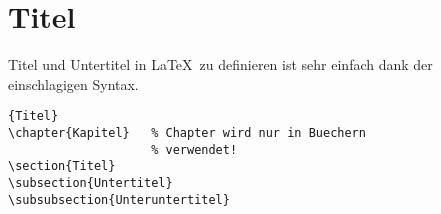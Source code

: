 \section{Titel}
\noindent
Titel und Untertitel in \LaTeX~zu definieren ist sehr
einfach dank der einschlagigen Syntax.

\begin{center}
\begin{lstlisting}[caption=Titel]{Titel}
\chapter{Kapitel}   % Chapter wird nur in Buechern
                    % verwendet!
\section{Titel}
\subsection{Untertitel}
\subsubsection{Unteruntertitel}
\end{lstlisting}
\end{center}
